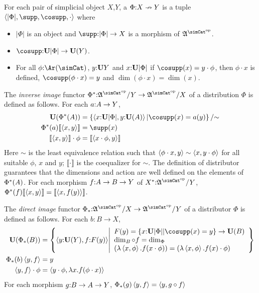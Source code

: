\documentclass[csh.tex]{subfiles}
\begin{document}
\newcommand\ecof[1]{\llbracket #1 \rrbracket}
\begin{definition} For each pair of simplicial object $X$,$Y$, a  $\Phi\mathord : X\nrightarrow Y$ is a tuple 
$\tuplet{|\Phi|,\supp,\cosupp,\cdot}$ where 
\begin{itemize}
\item $|\Phi|$ is an object and $\supp \of |\Phi| \to X$ is a morphism of $\ambient\s$.
\item $\cosupp\of\base|\Phi|\to\base(Y)$.
\item For all $\phi\of\Ar(\simCat)$, $y\mathord :\mathbf{U} Y$ and $x\mathord :\mathbf{U}|\Phi|$ 
if $\cosupp(x) = y\cdot \phi$, then $\phi\cdot x$ is defined, $\cosupp(\phi\cdot x) = y$ and $\dim(\phi\cdot x) = \dim(x)$.
\end{itemize}

The \emph{inverse image} functor $\Phi\ri\of\ambient\s/Y\to\ambient\s/X$ of a distribution $\Phi$ is defined as follows. 
For each $a\mathord : A\to Y$,
\begin{align*}
\base(\Phi\ri(A)) &= \set{\tuplet{x\of\base|\Phi|,y\of\base(A)} | \cosupp(x) = a(y) }/\mathord\sim\\
\Phi\ri(a)\ecof{\tuplet{x,y}} &= \supp(x)\\
\ecof{\tuplet{x,y}}\cdot\phi &= \ecof{\tuplet{x\cdot\phi,y}} \\
\end{align*}
Here $\sim$ is the least equivalence relation such that $\left\langle \phi\cdot x,y \right\rangle\sim\left\langle x,y\cdot\phi \right\rangle$ for all suitable $\phi$, $x$ and $y$; $\ecof{\cdot}$ is the coequalizer for $\sim$. The definition of distributor guarantees that the dimensions and action are well defined on the elements of $\Phi^*(A)$.
For each morphism $f\mathord : A\to B \to Y$ of $X\ri\of\ambient\s/Y$, $\Phi\ri(f)\ecof{\tuplet{x,y}} = \ecof{\tuplet{x,f(y)}}$.

The \emph{direct image} functor $\Phi_*\of\ambient\s/X\to\ambient\s/Y$ of a distributor $\Phi$ is defined as follows. For each $b:B\to X$,
\begin{align*}
\base(\Phi_*(B)) &= \set{ \tuplet{y\of\base(Y),f\of F(y)}  \middle| 
\begin{array}{l}
F(y) = \set{x\of \base|\Phi||\cosupp(x) = y}\to \base(B)\\
\dim_B\circ f = \dim_\Phi\\
(\function{\tuplet{x,\phi}}{f(x\cdot\phi)}) = (\function{\tuplet{x,\phi}}{f(x)\cdot\phi}) 
\end{array}
}\\
\Phi_*(b)\tuplet{y,f} &= y\\
\tuplet{y,f}\cdot \phi &= \tuplet{y\cdot \phi,\function x f(\phi\cdot x)}
\end{align*}
For each morphism $g\mathord : B\to A\to Y$, $\Phi_*(g)\left\langle y,f \right\rangle = \left\langle y,g\circ f \right\rangle$
\end{definition}
\end{document}
